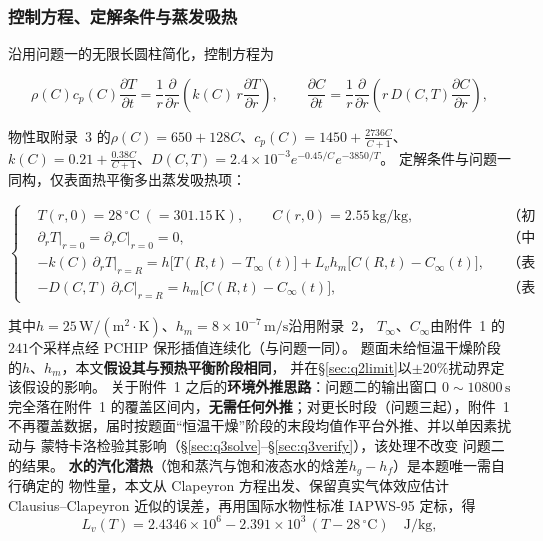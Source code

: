 \documentclass[withoutpreface,bwprint]{cumcmthesis} %
\begin{document}
\subsubsection{控制方程、定解条件与蒸发吸热}
\label{sec:q2gov}

沿用问题一的无限长圆柱简化，控制方程为

\begin{equation}
\label{eq:q2T}
\rho(C)c_p(C)\frac{\partial T}{\partial t}
=\frac{1}{r}\frac{\partial}{\partial r}\!\left(k(C)\,r\frac{\partial T}{\partial r}\right),
\qquad
\frac{\partial C}{\partial t}
=\frac{1}{r}\frac{\partial}{\partial r}\!\left(r\,D(C,T)\frac{\partial C}{\partial r}\right),
\end{equation}

物性取附录~3 的$\rho(C)=650+128C$、$c_p(C)=1450+\frac{2736C}{C+1}$、
$k(C)=0.21+\frac{0.38C}{C+1}$、$D(C,T)=2.4\times10^{-3}e^{-0.45/C}e^{-3850/T}$。
定解条件与问题一同构，仅表面热平衡多出蒸发吸热项：

\begin{equation}
\left\{
\begin{aligned}
    &T(r,0)=28\,^\circ\mathrm{C}\ (=301.15\,\mathrm{K}),\qquad C(r,0)=2.55\,\mathrm{kg/kg},
     &&\text{（初始条件）}\\[1pt]
    &\partial_r T\big|_{r=0}=\partial_r C\big|_{r=0}=0, &&\text{（中心对称）}\\[1pt]
    &-k(C)\,\partial_r T\big|_{r=R}=h\bigl[T(R,t)-T_\infty(t)\bigr]
     +L_v h_m\bigl[C(R,t)-C_\infty(t)\bigr], &&\text{（表面热平衡）}\\[1pt]
    &-D(C,T)\,\partial_r C\big|_{r=R}=h_m\bigl[C(R,t)-C_\infty(t)\bigr], &&\text{（表面传质）}
\end{aligned}
\right.
\label{eq:q2bc}
\end{equation}

其中$h=25\,\mathrm{W/(m^2\cdot K)}$、$h_m=8\times10^{-7}\,\mathrm{m/s}$沿用附录~2，
$T_\infty$、$C_\infty$由附件~1 的$241$个采样点经 PCHIP 保形插值连续化（与问题一同）。
题面未给恒温干燥阶段的$h$、$h_m$，本文\textbf{假设其与预热平衡阶段相同}，
并在\S\ref{sec:q2limit}以$\pm20\%$扰动界定该假设的影响。
关于附件~1 之后的\textbf{环境外推思路}：问题二的输出窗口 $0\sim10800\,\mathrm{s}$
完全落在附件~1 的覆盖区间内，\textbf{无需任何外推}；对更长时段（问题三起），附件~1
不再覆盖数据，届时按题面``恒温干燥''阶段的末段均值作平台外推、并以单因素扰动与
蒙特卡洛检验其影响（\S\ref{sec:q3solve}--\S\ref{sec:q3verify}），该处理不改变
问题二的结果。
\textbf{水的汽化潜热}（饱和蒸汽与饱和液态水的焓差$h_g-h_f$）是本题唯一需自行确定的
物性量，本文从 Clapeyron 方程出发、保留真实气体效应估计 Clausius--Clapeyron
近似的误差，再用国际水物性标准 IAPWS-95 定标，得
\begin{equation}
\label{eq:q2hevap}
L_v(T)=2.4346\times10^{6}
-2.391\times10^{3}\,(T-28\,^\circ\mathrm{C})\quad \mathrm{J/kg},
\end{equation}
\end{document}
